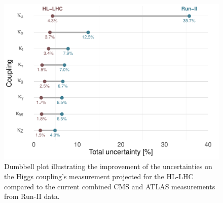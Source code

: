 \begin{figure}[htb!]
	\begin{center}
		\includegraphics[height=0.35\textheight]{figures/run2-hl-dumble}
		\caption{Dumbbell plot illustrating the improvement of the uncertainties on the Higgs coupling's measurement projected for the HL-LHC compared to the current combined CMS and ATLAS measurements from Run-II data.}	
		\label{fig:couplings-hlhlc}
	\end{center}
\end{figure}
